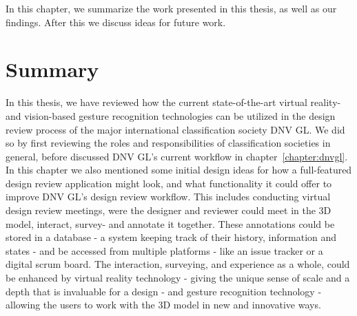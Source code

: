 
In this chapter, we summarize the work presented in this thesis, as well as our findings. After 
this we discuss ideas for future work.


\section{Summary}
In this thesis, we have reviewed how the current state-of-the-art virtual reality- and vision-based gesture recognition technologies can be utilized 
in the design review process of the major international classification society DNV GL. We did so by first reviewing the roles and responsibilities of classification societies 
in general, before discussed DNV GL's current workflow in chapter~\ref{chapter:dnvgl}. In this chapter we also mentioned some initial design ideas for how a full-featured 
design review application might look, and what functionality it could offer to improve DNV GL's design review workflow. This includes
conducting virtual design review meetings, were the designer and reviewer could meet in the 3D model, interact, survey- and annotate it together.
These annotations could be stored in a database - a system keeping track of their history, information and states - and be accessed from multiple platforms - like 
an issue tracker or a digital scrum board. The interaction, surveying, and experience as a whole, could be enhanced by virtual reality technology -
giving the unique sense of scale and a depth that is invaluable for a design - 
and gesture recognition technology - allowing the users to work with the 3D model in new and innovative ways. 

